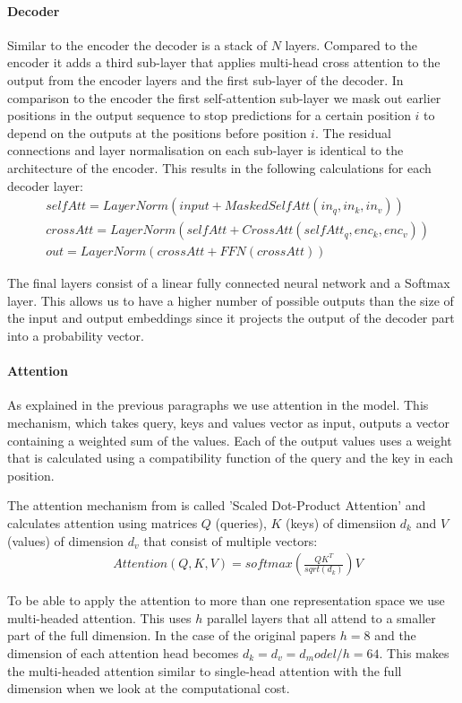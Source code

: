 \paragraph{Decoder}
Similar to the encoder the decoder is a stack of $N$ layers. Compared to the encoder it adds a third sub-layer that applies multi-head cross attention to the output from the encoder layers and the first sub-layer of the decoder. In comparison to the encoder the first self-attention sub-layer we mask out earlier positions in the output sequence to stop predictions for a certain position $i$ to depend on the outputs at the positions before position $i$. The residual connections and layer normalisation on each sub-layer is identical to the architecture of the encoder. This results in the following calculations for each decoder layer: 
\begin{align*}
&selfAtt = LayerNorm(input + MaskedSelfAtt(in_q, in_k, in_v))\\
&crossAtt = LayerNorm(selfAtt + CrossAtt(selfAtt_q, enc_k, enc_v))\\
&out = LayerNorm(crossAtt + FFN(crossAtt))
\end{align*}

The final layers consist of a linear fully connected neural network and a Softmax layer. This allows us to have a higher number of possible outputs than the size of the input and output embeddings since it projects the output of the decoder part into a probability vector.

\paragraph{Attention}

As explained in the previous paragraphs we use attention in the model. This mechanism, which takes query, keys and values vector as input, outputs a vector containing a weighted sum of the values. Each of the output values uses a weight that is calculated using a compatibility  function of the query and the key in each position.

The attention mechanism from \cite{vaswani_attention_2017} is called 'Scaled Dot-Product Attention' and calculates attention using matrices $Q$ (queries), $K$ (keys) of dimensiion $d_k$ and $V$ (values) of dimension $d_v$ that consist of multiple vectors:
\begin{align*}
&Attention(Q, K, V) = softmax(\frac{QK^T} {sqrt(d_k)})V
\end{align*}

To be able to apply the attention to more than one representation space we use multi-headed attention. This uses $h$ parallel layers that all attend to a smaller part of the full dimension. In the case of the original papers $h = 8$ and the dimension of each attention head becomes $d_k = d_v = d_model / h = 64$. This makes the multi-headed attention similar to single-head attention with the full dimension when we look at the computational cost.

